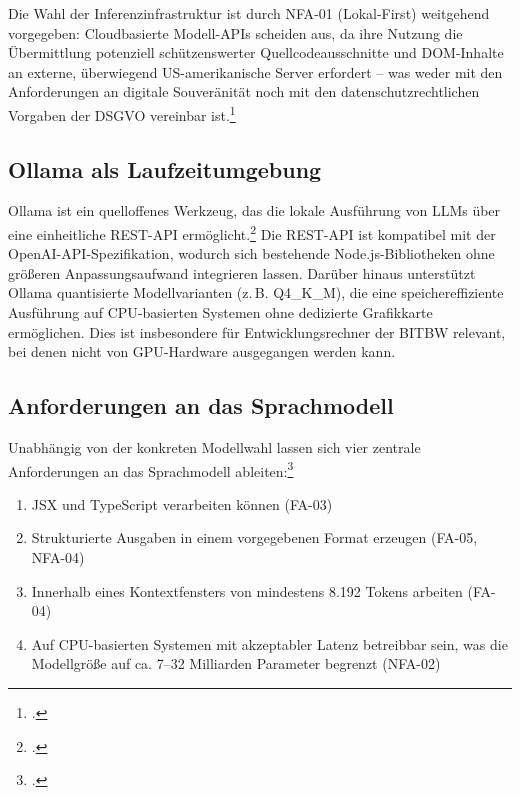 Die Wahl der Inferenzinfrastruktur ist durch \ac{NFA}-01 (Lokal-First) weitgehend vorgegeben: Cloudbasierte Modell-\ac{API}s scheiden aus, da ihre Nutzung die Übermittlung potenziell schützenswerter Quellcodeausschnitte und \ac{DOM}-Inhalte an externe, überwiegend US-amerikanische Server erfordert -- was weder mit den Anforderungen an digitale Souveränität noch mit den datenschutzrechtlichen Vorgaben der \ac{DSGVO} vereinbar ist.\footcites[Vgl.][]{bmds_digitale_souveraenitaet}[][Art. 28 und Art. 44 ff.]{dsgvo2016}

\subsection{Ollama als Laufzeitumgebung}

Ollama ist ein quelloffenes Werkzeug, das die lokale Ausführung von \ac{LLM}s über eine einheit\-liche REST-\ac{API} ermöglicht.\footcite[Vgl.][]{Ollama} Die REST-\ac{API} ist kompatibel mit der OpenAI-\ac{API}-Spezifikation, wodurch sich bestehende Node.js-Bibliotheken ohne größeren Anpassungsaufwand integrieren lassen. Darüber hinaus unterstützt Ollama quantisierte Modellvarianten (z.\,B. Q4\_K\_M), die eine speichereffiziente Ausführung auf \ac{CPU}-basierten Systemen ohne dedizierte Grafikkarte ermöglichen. Dies ist insbesondere für Entwicklungsrechner der \ac{BITBW} relevant, bei denen nicht von \ac{GPU}-Hardware ausgegangen werden kann.

\subsection{Anforderungen an das Sprachmodell}

Unabhängig von der konkreten Modellwahl lassen sich vier zentrale Anforderungen an das Sprachmodell ableiten:\footcite[Vgl.][S. 3]{hui2024qwen25coder}

\begin{enumerate}
    \item \ac{JSX} und TypeScript verarbeiten können (\ac{FA}-03)
    \item Strukturierte Ausgaben in einem vorgegebenen Format erzeugen (\ac{FA}-05, \ac{NFA}-04)
    \item Innerhalb eines Kontextfensters von mindestens 8.192 Tokens arbeiten (\ac{FA}-04)
    \item Auf \ac{CPU}-basierten Systemen mit akzeptabler Latenz betreibbar sein, was die Modellgröße auf ca. 7--32 Milliarden Parameter begrenzt (\ac{NFA}-02)
\end{enumerate}

